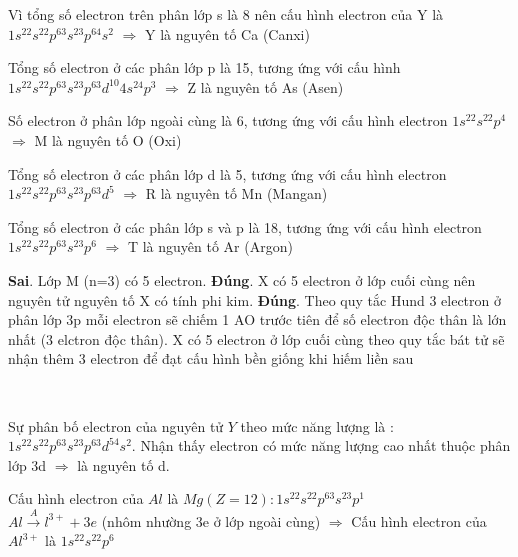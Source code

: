 \begin{loigiaiex}{28}
 Vì tổng số electron trên phân lớp s là 8 nên cấu hình electron của Y là $1s^22s^22p^63s^23p^64s^2$ $\Rightarrow $ Y là nguyên tố Ca (Canxi) \phantom {a}\hfill { \faKey ~}
\end{loigiaiex}
\begin{loigiaiex}{29}
 Tổng số electron ở các phân lớp p là 15, tương ứng với cấu hình $1s^22s^22p^63s^23p^63d^{10}4s^24p^3$ $\Rightarrow $ Z là nguyên tố As (Asen) \phantom {a}\hfill { \faKey ~}
\end{loigiaiex}
\begin{loigiaiex}{30}
 Số electron ở phân lớp ngoài cùng là 6, tương ứng với cấu hình electron $1s^22s^22p^4$ $\Rightarrow $ M là nguyên tố O (Oxi) \phantom {a}\hfill { \faKey ~}
\end{loigiaiex}
\begin{loigiaiex}{31}
 Tổng số electron ở các phân lớp d là 5, tương ứng với cấu hình electron $1s^22s^22p^63s^23p^63d^5$ $\Rightarrow $ R là nguyên tố Mn (Mangan) \phantom {a}\hfill { \faKey ~}
\end{loigiaiex}
\begin{loigiaiex}{32}
 Tổng số electron ở các phân lớp s và p là 18, tương ứng với cấu hình electron $1s^22s^22p^63s^23p^6$ $\Rightarrow $ T là nguyên tố Ar (Argon) \phantom {a}\hfill { \faKey ~}
\end{loigiaiex}
\begin{loigiaiex}{33}
 \begin {\itemchoice } \itemch \textbf {Sai}. Lớp M (n=3) có 5 electron. \itemch \textbf {Đúng}. X có 5 electron ở lớp cuối cùng nên nguyên tử nguyên tố X có tính phi kim. \itemch \textbf {Đúng}. Theo quy tắc Hund 3 electron ở phân lớp 3p mỗi electron sẽ chiếm 1 AO trước tiên để số electron độc thân là lớn nhất (3 elctron độc thân). \itemch X có 5 electron ở lớp cuối cùng theo quy tắc bát tử sẽ nhận thêm 3 electron để đạt cấu hình bền giống khi hiếm liền sau \end {\itemchoice }  \phantom {a}\hfill { \faKey ~}
\end{loigiaiex}
\begin{loigiaiex}{34}
 Sự phân bố electron của nguyên tử $Y$ theo mức năng lượng là : $1s^22s^22p^63s^23p^63d^54s^2$. Nhận thấy electron có mức năng lượng cao nhất thuộc phân lớp 3d $\Rightarrow $ là nguyên tố d.  \phantom {a}\hfill { \faKey ~}
\end{loigiaiex}
\begin{loigiaiex}{35}
 Cấu hình electron của $Al$ là $Mg(Z=12):1s^22s^22p^63s^23p^1$ \\ $Al\xrightarrow Al^{3+} + 3e$ (nhôm nhường 3e ở lớp ngoài cùng) $\Rightarrow $ Cấu hình electron của $Al^{3+}$ là $1s^22s^22p^6$  \phantom {a}\hfill { \faKey ~}
\end{loigiaiex}
